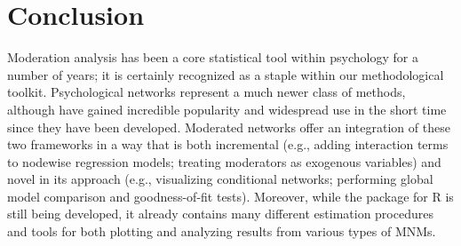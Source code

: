 \chapter{Conclusion}
Moderation analysis has been a core statistical tool within psychology for a number of years; it is certainly recognized as a staple within our methodological toolkit. Psychological networks represent a much newer class of methods, although have gained incredible popularity and widespread use in the short time since they have been developed. Moderated networks offer an integration of these two frameworks in a way that is both incremental (e.g., adding interaction terms to nodewise regression models; treating moderators as exogenous variables) and novel in its approach (e.g., visualizing conditional networks; performing global model comparison and goodness-of-fit tests). Moreover, while the  package for R is still being developed, it already contains many different estimation procedures and tools for both plotting and analyzing results from various types of MNMs. 
